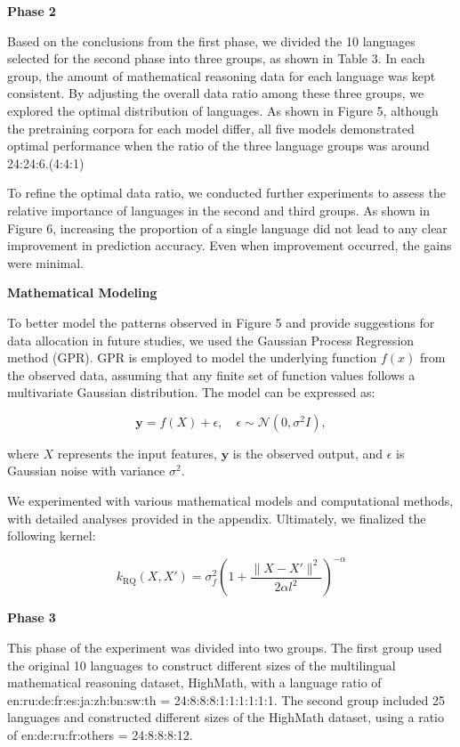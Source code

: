 \documentclass[11pt]{article}
\begin{document}
\textbf{Phase 2}

Based on the conclusions from the first phase, we divided the 10 languages selected for the second phase into three groups, as shown in Table 3. In each group, the amount of mathematical reasoning data for each language was kept consistent. By adjusting the overall data ratio among these three groups, we explored the optimal distribution of languages. 
As shown in Figure 5, although the pretraining corpora for each model differ, all five models demonstrated optimal performance when the ratio of the three language groups was around 24:24:6.(4:4:1) 

To refine the optimal data ratio, we conducted further experiments to assess the relative importance of languages in the second and third groups. As shown in Figure 6, increasing the proportion of a single language did not lead to any clear improvement in prediction accuracy. Even when improvement occurred, the gains were minimal.

\textbf{Mathematical Modeling}

To better model the patterns observed in Figure 5 and provide suggestions for data allocation in future studies, we used the Gaussian Process Regression method (GPR). GPR is employed to model the underlying function \(f(x)\) from the observed data, assuming that any finite set of function values follows a multivariate Gaussian distribution. The model can be expressed as:

\[
\mathbf{y} = f(X) + \epsilon, \quad \epsilon \sim \mathcal{N}(0, \sigma^2 I),
\]

where \(X\) represents the input features, \(\mathbf{y}\) is the observed output, and \(\epsilon\) is Gaussian noise with variance \(\sigma^2\).

We experimented with various mathematical models and computational methods, with detailed analyses provided in the appendix. Ultimately, we finalized the following kernel:

\[
k_{\text{RQ}}(X, X') = \sigma_f^2 \left(1 + \frac{\| X - X' \|^2}{2 \alpha l^2} \right)^{-\alpha}
\]

\textbf{Phase 3}

This phase of the experiment was divided into two groups. The first group used the original 10 languages to construct different sizes of the multilingual mathematical reasoning dataset, HighMath, with a language ratio of en:ru:de:fr:es:ja:zh:bn:sw:th = 24:8:8:8:1:1:1:1:1:1. The second group included 25 languages and constructed different sizes of the HighMath dataset, using a ratio of en:de:ru:fr:others = 24:8:8:8:12.
\end{document}
